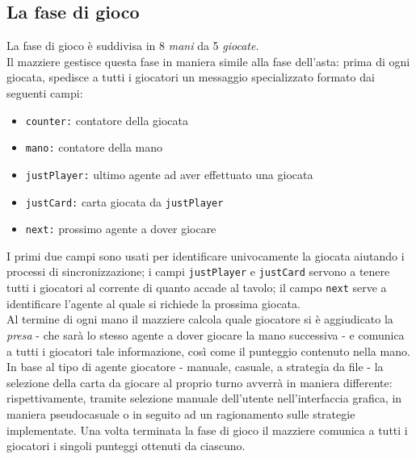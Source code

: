 \subsection{La fase di gioco}
La fase di gioco è suddivisa in 8 \emph{mani} da 5 \emph{giocate}.\\
Il mazziere gestisce questa fase in maniera simile alla fase dell'asta: prima di ogni giocata, spedisce a tutti i giocatori un messaggio specializzato formato dai seguenti campi:
\begin{itemize}
   \item \texttt{counter:} contatore della giocata
   \item \texttt{mano:} contatore della mano
   \item \texttt{justPlayer:} ultimo agente ad aver effettuato una giocata
   \item \texttt{justCard:}   carta giocata da \texttt{justPlayer}
   \item \texttt{next:}   prossimo agente a dover giocare
\end{itemize}
I primi due campi sono usati per identificare univocamente la giocata aiutando i processi di sincronizzazione; i campi \texttt{justPlayer} e \texttt{justCard} servono a tenere tutti i giocatori al corrente di quanto accade al tavolo; il campo \texttt{next} serve a identificare l'agente al quale si richiede la prossima giocata.\\
Al termine di ogni mano il mazziere calcola quale giocatore si è aggiudicato la \emph{presa} - che sarà lo stesso agente a dover giocare la mano successiva - e comunica a tutti i giocatori tale informazione, così come il punteggio contenuto nella mano.\\
In base al tipo di agente giocatore - manuale, casuale, a strategia da file - la selezione della carta da giocare al proprio turno avverrà in maniera differente: rispettivamente, tramite selezione manuale dell'utente nell'interfaccia grafica, in maniera pseudocasuale o in seguito ad un ragionamento sulle strategie implementate.
Una volta terminata la fase di gioco il mazziere comunica a tutti i giocatori i singoli punteggi ottenuti da ciascuno.

